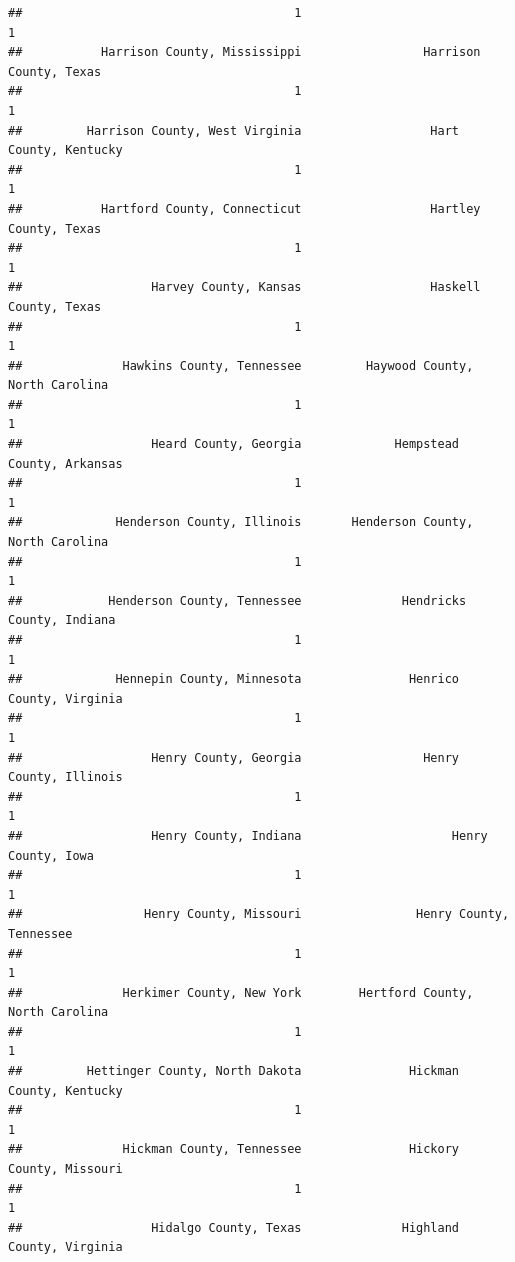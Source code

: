 \documentclass[
]{article}
\begin{document}
\begin{verbatim}
##                                      1                                      1 
##           Harrison County, Mississippi                 Harrison County, Texas 
##                                      1                                      1 
##         Harrison County, West Virginia                  Hart County, Kentucky 
##                                      1                                      1 
##           Hartford County, Connecticut                  Hartley County, Texas 
##                                      1                                      1 
##                  Harvey County, Kansas                  Haskell County, Texas 
##                                      1                                      1 
##              Hawkins County, Tennessee         Haywood County, North Carolina 
##                                      1                                      1 
##                  Heard County, Georgia             Hempstead County, Arkansas 
##                                      1                                      1 
##             Henderson County, Illinois       Henderson County, North Carolina 
##                                      1                                      1 
##            Henderson County, Tennessee              Hendricks County, Indiana 
##                                      1                                      1 
##             Hennepin County, Minnesota               Henrico County, Virginia 
##                                      1                                      1 
##                  Henry County, Georgia                 Henry County, Illinois 
##                                      1                                      1 
##                  Henry County, Indiana                     Henry County, Iowa 
##                                      1                                      1 
##                 Henry County, Missouri                Henry County, Tennessee 
##                                      1                                      1 
##              Herkimer County, New York        Hertford County, North Carolina 
##                                      1                                      1 
##         Hettinger County, North Dakota               Hickman County, Kentucky 
##                                      1                                      1 
##              Hickman County, Tennessee               Hickory County, Missouri 
##                                      1                                      1 
##                  Hidalgo County, Texas              Highland County, Virginia 

\end{verbatim}
\end{document}

